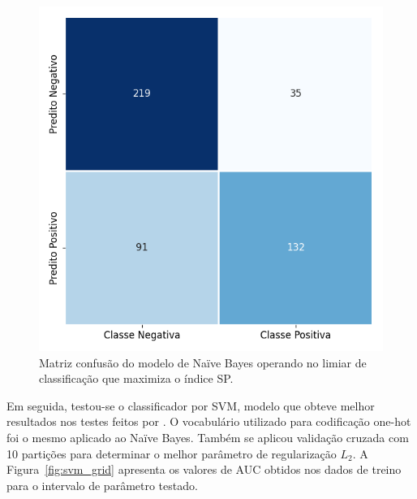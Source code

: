 \begin{figure}[h!]
\begin{center} {
    \begin{center}
    \includegraphics[scale=0.65]{images/nb_cm.png}
    \caption{Matriz confusão do modelo de Naïve Bayes operando no limiar de classificação que maximiza o índice SP.}
    \label{fig:nb_confusion}
    \end{center}
}
\end{center}
\end{figure}

Em seguida, testou-se o classificador por SVM, modelo que obteve melhor
resultados nos testes feitos por \citet{go09}.
O vocabulário utilizado para codificação one-hot foi o mesmo aplicado ao
Naïve Bayes.
Também se aplicou validação cruzada com 10 partições para determinar o melhor
parâmetro de regularização $L_2$.
A Figura~\ref{fig:svm_grid} apresenta os valores de AUC obtidos nos dados de
treino para o intervalo de parâmetro testado.

